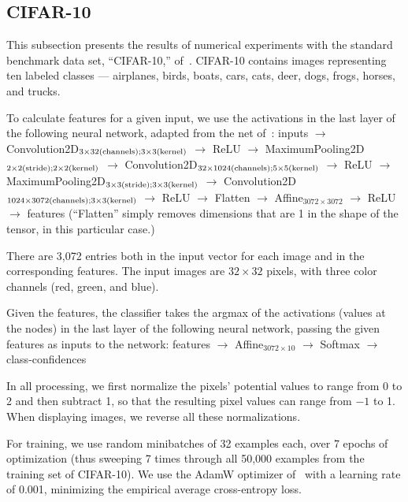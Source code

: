 \documentclass[]{fairmeta}
\begin{document}
\subsection{CIFAR-10}
\label{cifar10}

This subsection presents the results of numerical experiments
with the standard benchmark data set, ``CIFAR-10,'' of~\cite{krizhevsky}.
CIFAR-10 contains images representing ten labeled classes
--- airplanes, birds, boats, cars, cats, deer, dogs, frogs, horses, and trucks.

To calculate features for a given input, we use the activations
in the last layer of the following neural network,
adapted from the net of~\cite{shahrestani}:
inputs $\rightarrow$
Convolution2D$_{\rm 3 \times 32(channels); 3 \times 3(kernel)}$ $\rightarrow$
ReLU $\rightarrow$
MaximumPooling2D$_{\rm 2 \times 2(stride); 2 \times 2(kernel)}$ $\rightarrow$
Convolution2D$_{\rm 32 \times 1024(channels); 5 \times 5(kernel)}$ $\rightarrow$
ReLU $\rightarrow$
MaximumPooling2D$_{\rm 3 \times 3(stride); 3 \times 3(kernel)}$ $\rightarrow$
Convolution2D$_{\rm 1024 \times 3072(channels); 3 \times 3(kernel)}$
$\rightarrow$
ReLU $\rightarrow$
Flatten $\rightarrow$
Affine$_{3072 \times 3072}$ $\rightarrow$
ReLU $\rightarrow$
features
(``Flatten'' simply removes dimensions that are 1 in the shape of the tensor,
in this particular case.)

There are 3,072 entries both in the input vector for each image
and in the corresponding features. The input images are $32 \times 32$ pixels,
with three color channels (red, green, and blue).

Given the features, the classifier takes the argmax of the activations
(values at the nodes) in the last layer of the following neural network,
passing the given features as inputs to the network:
features $\rightarrow$
Affine$_{3072 \times 10}$ $\rightarrow$
Softmax $\rightarrow$
class-confidences

In all processing, we first normalize the pixels' potential values
to range from 0 to 2 and then subtract 1, so that the resulting pixel values
can range from $-1$ to 1. When displaying images,
we reverse all these normalizations.

For training, we use random minibatches of 32 examples each,
over 7 epochs of optimization (thus sweeping 7 times
through all 50,000 examples from the training set of CIFAR-10).
We use the AdamW optimizer of~\cite{loshchilov-hutter} with a learning rate
of 0.001, minimizing the empirical average cross-entropy loss.
\end{document}
